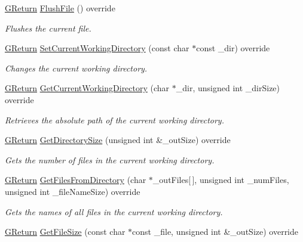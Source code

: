 \begin{DoxyCompactItemize}
\hyperlink{namespaceGW_a67a839e3df7ea8a5c5686613a7a3de21}{G\+Return} \hyperlink{classFileIO_a8e5afdb1a734f37e422ff0147561a3a1}{Flush\+File} () override
\begin{DoxyCompactList}\small\item\em Flushes the current file. \end{DoxyCompactList}\item 
\hyperlink{namespaceGW_a67a839e3df7ea8a5c5686613a7a3de21}{G\+Return} \hyperlink{classFileIO_a8332ededccf4034fd83509d9513a2635}{Set\+Current\+Working\+Directory} (const char $\ast$const \+\_\+dir) override
\begin{DoxyCompactList}\small\item\em Changes the current working directory. \end{DoxyCompactList}\item 
\hyperlink{namespaceGW_a67a839e3df7ea8a5c5686613a7a3de21}{G\+Return} \hyperlink{classFileIO_a41a1859ffe3ebd76005f264af0b1ea66}{Get\+Current\+Working\+Directory} (char $\ast$\+\_\+dir, unsigned int \+\_\+dir\+Size) override
\begin{DoxyCompactList}\small\item\em Retrieves the absolute path of the current working directory. \end{DoxyCompactList}\item 
\hyperlink{namespaceGW_a67a839e3df7ea8a5c5686613a7a3de21}{G\+Return} \hyperlink{classFileIO_ae331f6c02948720d9cc5bcd2700d8cf7}{Get\+Directory\+Size} (unsigned int \&\+\_\+out\+Size) override
\begin{DoxyCompactList}\small\item\em Gets the number of files in the current working directory. \end{DoxyCompactList}\item 
\hyperlink{namespaceGW_a67a839e3df7ea8a5c5686613a7a3de21}{G\+Return} \hyperlink{classFileIO_afd1b77afed3d853aaa01f14ecbc6b0e0}{Get\+Files\+From\+Directory} (char $\ast$\+\_\+out\+Files\mbox{[}$\,$\mbox{]}, unsigned int \+\_\+num\+Files, unsigned int \+\_\+file\+Name\+Size) override
\begin{DoxyCompactList}\small\item\em Gets the names of all files in the current working directory. \end{DoxyCompactList}\item 
\hyperlink{namespaceGW_a67a839e3df7ea8a5c5686613a7a3de21}{G\+Return} \hyperlink{classFileIO_a91ee3ceabd5d6097eed85466c26d2adb}{Get\+File\+Size} (const char $\ast$const \+\_\+file, unsigned int \&\+\_\+out\+Size) override

\end{DoxyCompactItemize}
